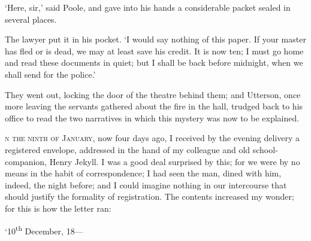 \documentclass[]{novel}
\begin{document}
‘Here, sir,’ said Poole, and gave into his hands a considerable packet sealed in several places.

The lawyer put it in his pocket. ‘I would say nothing of this paper. If your master has fled or is dead, we may at least save his credit. It is now ten; I must go home and read these documents in quiet; but I shall be back before midnight, when we shall send for the police.’

They went out, locking the door of the theatre behind them; and Utterson, once more leaving the servants gathered about the fire in the hall, trudged back to his office to read the two narratives in which this mystery was now to be explained.

\clearpage
\label{ch:09}
\begin{ChapterStart}
\vspace*{4\nbs}
\null\vspace{0.75\nbs}
\end{ChapterStart}

\textsc{n the ninth of January,} now four days ago, I received by the evening delivery a registered envelope, addressed in the hand of my colleague and old school-companion, Henry Jekyll. I was a good deal surprised by this; for we were by no means in the habit of correspondence; I had seen the man, dined with him, indeed, the night before; and I could imagine nothing in our intercourse that should justify the formality of registration. The contents increased my wonder; for this is how the letter ran:\par\null

\begin{parascale}[0.875]
\stake\hfill{}‘10\textsuperscript{th} December, 18—\hspace{1.5em}
\end{parascale}\vspace{0.597\nbs}
\end{document}
